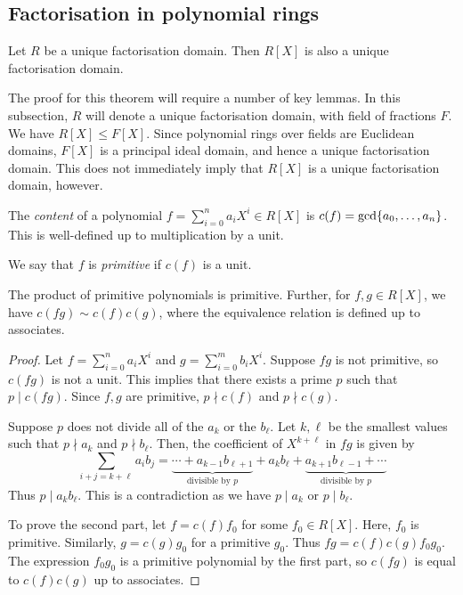 \subsection{Factorisation in polynomial rings}
\begin{theorem}
	Let \( R \) be a unique factorisation domain.
	Then \( R[X] \) is also a unique factorisation domain.
\end{theorem}
The proof for this theorem will require a number of key lemmas.
In this subsection, \( R \) will denote a unique factorisation domain, with field of fractions \( F \).
We have \( R[X] \leq F[X] \).
Since polynomial rings over fields are Euclidean domains, \( F[X] \) is a principal ideal domain, and hence a unique factorisation domain.
This does not immediately imply that \( R[X] \) is a unique factorisation domain, however.
\begin{definition}
	The \textit{content} of a polynomial \( f = \sum_{i=0}^n a_i X^i \in R[X] \) is \( c(f) = \mathrm{gcd}\qty{a_0, \dots, a_n} \).
	This is well-defined up to multiplication by a unit.

	We say that \( f \) is \textit{primitive} if \( c(f) \) is a unit.
\end{definition}
\begin{lemma}
	The product of primitive polynomials is primitive.
	Further, for \( f, g \in R[X] \), we have \( c(fg) \sim c(f)c(g) \), where the equivalence relation is defined up to associates.
\end{lemma}
\begin{proof}
	Let \( f = \sum_{i=0}^n a_i X^i \) and \( g = \sum_{i=0}^m b_i X^i \).
	Suppose \( fg \) is not primitive, so \( c(fg) \) is not a unit.
	This implies that there exists a prime \( p \) such that \( p \mid c(fg) \).
	Since \( f, g \) are primitive, \( p \nmid c(f) \) and \( p \nmid c(g) \).

	Suppose \( p \) does not divide all of the \( a_k \) or the \( b_\ell \).
	Let \( k, \ell \) be the smallest values such that \( p \nmid a_k \) and \( p \nmid b_\ell \).
	Then, the coefficient of \( X^{k+\ell} \) in \( fg \) is given by
	\[
		\sum_{i+j=k+\ell} a_i b_j = \underbrace{\cdots + a_{k-1} b_{\ell+1}}_{\text{divisible by } p} + a_k b_\ell + \underbrace{a_{k+1} b_{\ell - 1} + \cdots}_{\text{divisible by } p}
	\]
	Thus \( p \mid a_k b_\ell \).
	This is a contradiction as we have \( p \mid a_k \) or \( p \mid b_\ell \).

	To prove the second part, let \( f = c(f) f_0 \) for some \( f_0 \in R[X] \).
	Here, \( f_0 \) is primitive.
	Similarly, \( g = c(g) g_0 \) for a primitive \( g_0 \).
	Thus \( fg = c(f) c(g) f_0 g_0 \).
	The expression \( f_0 g_0 \) is a primitive polynomial by the first part, so \( c(fg) \) is equal to \( c(f) c(g) \) up to associates.
\end{proof}
